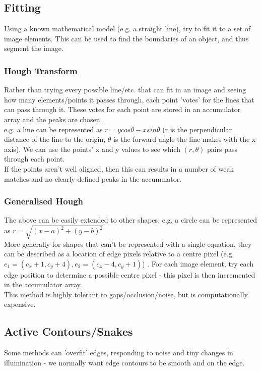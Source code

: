 \subsection{Fitting}
Using a known mathematical model (e.g. a straight line), try to fit it to a set of image elements. This can be used to find the boundaries of an object, and thus segment the image.\\

\subsubsection{Hough Transform}
Rather than trying every possible line/etc. that can fit in an image and seeing how many elements/points it passes through, each point 'votes' for the lines that can pass through it. These votes for each point are stored in an accumulator array and the peaks are chosen. \\

e.g. a line can be represented as $r= ycos\theta -xsin\theta$ (r is the perpendicular distance of the line to the origin, 
$\theta$ is the forward angle the line makes with the x axis). We can use the points' x and y values to see which $(r,\theta)$ pairs pass through each point.\\
 If the points aren't well aligned, then this can results in a number of weak matches and no clearly defined peaks in the accumulator. 

\subsubsection{Generalised Hough}
The above can be easily extended to other shapes. e.g. a circle can be represented as $r = \sqrt{(x-a)^2 + (y-b)^2}$\\

More generally for shapes that can't be represented with a single equation, they can be described as a location of edge pixels relative to a centre pixel (e.g. $e_1 = (c_x+1,c_y+4), e_2=(c_x-4,c_y+1)$) . For each image element, try each edge position to determine a possible centre pixel - this pixel is then incremented in the accumulator array. \\

This method is highly tolerant to gaps/occlusion/noise, but is computationally expensive. 

\subsection{Active Contours/Snakes}
Some methods can 'overfit' edges, responding to noise and tiny changes in illumination - we normally want edge contours to be smooth and on the edge. 

